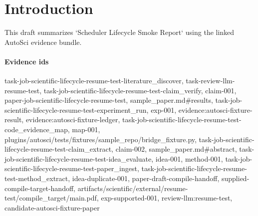 \section{Introduction}
This draft summarizes `Scheduler Lifecycle Smoke Report` using the linked AutoSci evidence bundle.

\paragraph{Evidence ids} task-job-scientific-lifecycle-resume-test-literature\_discover, task-review-llm-resume-test, task-job-scientific-lifecycle-resume-test-claim\_verify, claim-001, paper-job-scientific-lifecycle-resume-test, sample\_paper.md\#results, task-job-scientific-lifecycle-resume-test-experiment\_run, exp-001, evidence:autosci-fixture-result, evidence:autosci-fixture-ledger, task-job-scientific-lifecycle-resume-test-code\_evidence\_map, map-001, plugins/autosci/tests/fixtures/sample\_repo/bridge\_fixture.py, task-job-scientific-lifecycle-resume-test-claim\_extract, claim-002, sample\_paper.md\#abstract, task-job-scientific-lifecycle-resume-test-idea\_evaluate, idea-001, method-001, task-job-scientific-lifecycle-resume-test-paper\_ingest, task-job-scientific-lifecycle-resume-test-method\_extract, idea-duplicate-001, paper-draft-compile-handoff, supplied-compile-target-handoff, artifacts/scientific/external/resume-test/compile\_target/main.pdf, exp-supported-001, review-llm:resume-test, candidate-autosci-fixture-paper
